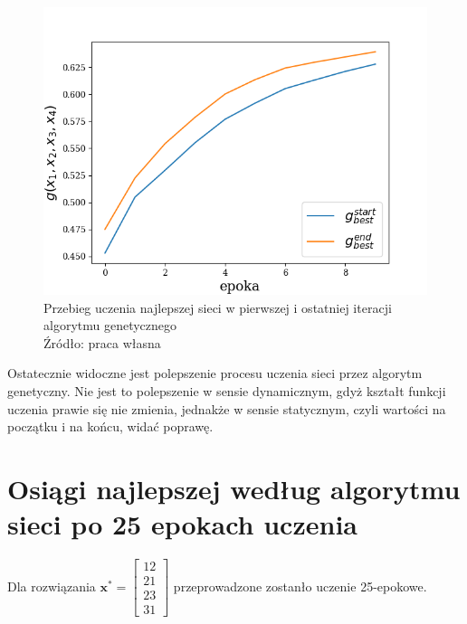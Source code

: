 \begin{figure}[h!tb]
	 \centering
	 \includegraphics[width = 0.9\linewidth]{img/iter_learn_best}
	 \caption{Przebieg uczenia najlepszej sieci w pierwszej i ostatniej iteracji algorytmu genetycznego\\
              Źródło: praca własna}
	 \label{fig:iter_learn_best}
\end{figure}

Ostatecznie widoczne jest polepszenie procesu uczenia sieci przez algorytm genetyczny.
Nie jest to polepszenie w sensie dynamicznym, gdyż kształt funkcji uczenia prawie się nie zmienia, jednakże w sensie statycznym, czyli wartości na początku i na końcu, widać poprawę.

\section{Osiągi najlepszej według algorytmu sieci po 25 epokach uczenia}
Dla rozwiązania $\mathbf{x^*} = \begin{bmatrix}12 \\ 21 \\ 23 \\ 31\end{bmatrix}$ przeprowadzone zostanło uczenie 25-epokowe.

